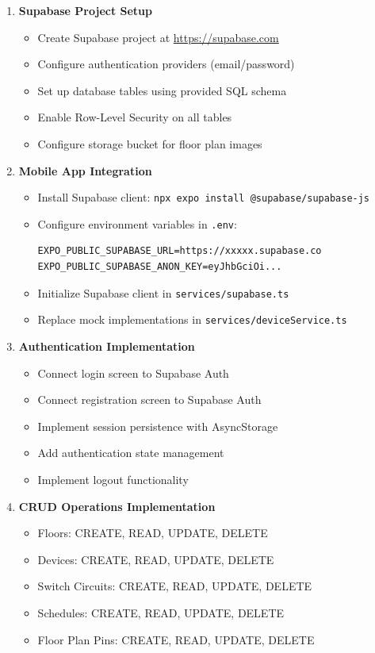 \documentclass[12pt,a4paper]{article}
\begin{document}
\begin{enumerate}[leftmargin=*]
    \item \textbf{Supabase Project Setup}
    \begin{itemize}
        \item Create Supabase project at \url{https://supabase.com}
        \item Configure authentication providers (email/password)
        \item Set up database tables using provided SQL schema
        \item Enable Row-Level Security on all tables
        \item Configure storage bucket for floor plan images
    \end{itemize}
    
    \item \textbf{Mobile App Integration}
    \begin{itemize}
        \item Install Supabase client: \texttt{npx expo install @supabase/supabase-js}
        \item Configure environment variables in \texttt{.env}:
        \begin{verbatim}
EXPO_PUBLIC_SUPABASE_URL=https://xxxxx.supabase.co
EXPO_PUBLIC_SUPABASE_ANON_KEY=eyJhbGciOi...
        \end{verbatim}
        \item Initialize Supabase client in \texttt{services/supabase.ts}
        \item Replace mock implementations in \texttt{services/deviceService.ts}
    \end{itemize}
    
    \item \textbf{Authentication Implementation}
    \begin{itemize}
        \item Connect login screen to Supabase Auth
        \item Connect registration screen to Supabase Auth
        \item Implement session persistence with AsyncStorage
        \item Add authentication state management
        \item Implement logout functionality
    \end{itemize}
    
    \item \textbf{CRUD Operations Implementation}
    \begin{itemize}
        \item Floors: CREATE, READ, UPDATE, DELETE
        \item Devices: CREATE, READ, UPDATE, DELETE
        \item Switch Circuits: CREATE, READ, UPDATE, DELETE
        \item Schedules: CREATE, READ, UPDATE, DELETE
        \item Floor Plan Pins: CREATE, READ, UPDATE, DELETE
    \end{itemize}
\end{enumerate}
\end{document}
